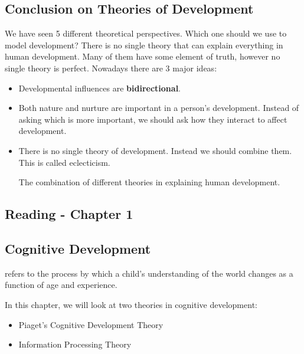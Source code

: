 \documentclass[../main/main.tex]{subfiles}
\begin{document}
\subsection{Conclusion on Theories of Development}

We have seen 5 different theoretical perspectives. Which one should we use to model development? There is no single theory that can explain everything in human development. Many of them have some element of truth, however no single theory is perfect. Nowadays there are 3 major ideas:

\begin{itemize}
  \item Developmental influences are \textbf{bidirectional}.
\item Both nature and nurture are important in a person's development. Instead of asking which is more important, we should ask how they interact to affect development.
  \item There is no single theory of development. Instead we should combine them. This is called eclecticism.
\begin{definition}  The combination of different theories in explaining human development.
\end{definition}
\end{itemize}

\subsection{Reading - Chapter 1}

\subsection{Cognitive Development}
\begin{definition}
 refers to the process by which a child's understanding of the world changes as a function of age and experience.
\end{definition}
In this chapter, we will look at two theories in cognitive development:
\begin{itemize}
\item Piaget's Cognitive Development Theory
        \item Information Processing Theory
\end{itemize}
\end{document}
